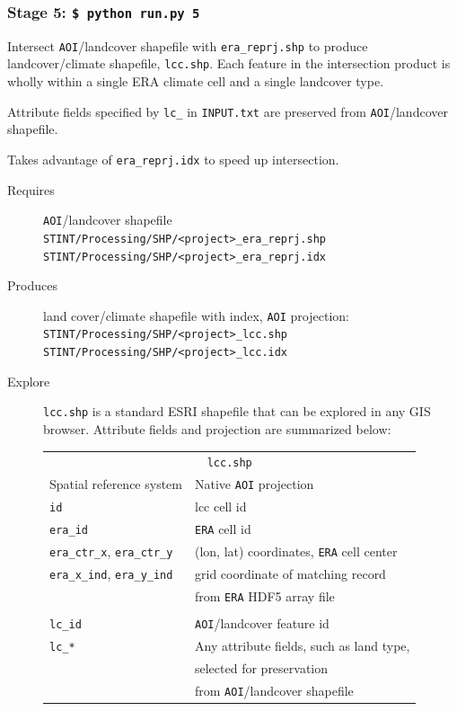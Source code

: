 \documentclass[twoside,a4paper]{refart}
\begin{document}
\subsubsection{\textbf{Stage 5:} \texttt{\$ python run.py 5}}
Intersect \texttt{AOI}/landcover shapefile with \texttt{era\_reprj.shp} to produce landcover/climate shapefile, \texttt{lcc.shp}.  Each feature in the intersection product is wholly within a single ERA climate cell and a single landcover type.
          
Attribute fields specified by \texttt{lc\_} in \texttt{INPUT.txt} are preserved from \texttt{AOI}/landcover shapefile.
          
Takes advantage of \texttt{era\_reprj.idx} to speed up intersection.

  \begin{description}
    \item [Requires]
      \texttt{AOI}/landcover shapefile\\
      \texttt{STINT/Processing/SHP/<project>\_era\_reprj.shp}\\
      \texttt{STINT/Processing/SHP/<project>\_era\_reprj.idx}  
  
  
    \item [Produces]
      land cover/climate shapefile with index, 
      \texttt{AOI} projection:\\
      \texttt{STINT/Processing/SHP/<project>\_lcc.shp}\\
      \texttt{STINT/Processing/SHP/<project>\_lcc.idx}

    \item [Explore]
      \texttt{lcc.shp} is a standard ESRI shapefile that can be explored in any GIS browser.  Attribute fields and projection are summarized below:
      
\begin{tabular}{ll}
       \multicolumn{2}{c}{\texttt{lcc.shp}} \\
Spatial reference system        & Native \texttt{AOI} projection \\
\texttt{id}                     & lcc cell id \\  
\texttt{era\_id}                & \texttt{ERA} cell id \\  
\texttt{era\_ctr\_x}, \texttt{era\_ctr\_y} & (lon, lat) coordinates, \texttt{ERA} cell center \\
\texttt{era\_x\_ind}, \texttt{era\_y\_ind} & grid coordinate of matching record \\
                                          & from \texttt{ERA} HDF5 array file\\
\\
\texttt{lc\_id}                & \texttt{AOI}/landcover feature id \\
\texttt{lc\_*}                & Any attribute fields, such as land type, \\
                             & selected for preservation \\
                             & from \texttt{AOI}/landcover shapefile \\

\end{tabular}
  \end{description}
\end{document}
